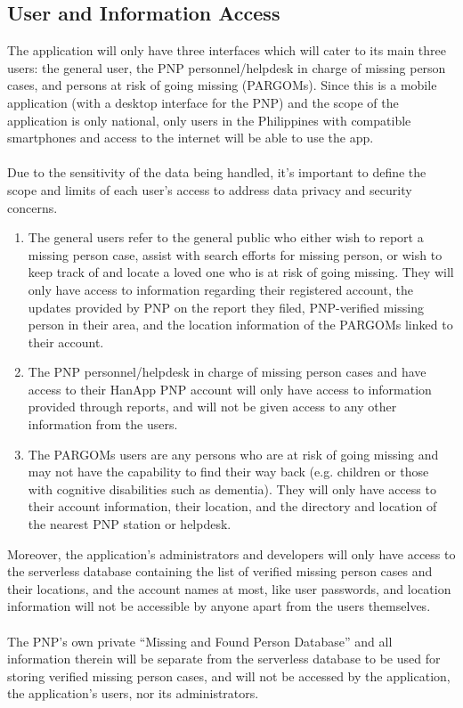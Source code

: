 \subsection{User and Information Access}
The application will only have three interfaces which will cater to its main three users: the general user, the PNP personnel/helpdesk in charge of missing person cases, and persons at risk of going missing (PARGOMs). Since this is a mobile application (with a desktop interface for the PNP) and the scope of the application is only national, only users in the Philippines with compatible smartphones and access to the internet will be able to use the app.
\\\\Due to the sensitivity of the data being handled, it’s important to define the scope and limits of each user’s access to address data privacy and security concerns.
\begin{enumerate}
    \item The general users refer to the general public who either wish to report a missing person case, assist with search efforts for missing person, or wish to keep track of and locate a loved one who is at risk of going missing. They will only have access to information regarding their registered account, the updates provided by PNP on the report they filed, PNP-verified missing person in their area, and the location information of the PARGOMs linked to their account.
    \item The PNP personnel/helpdesk in charge of missing person cases and have access to their HanApp PNP account will only have access to information provided through reports, and will not be given access to any other information from the users.
    \item The PARGOMs users are any persons who are at risk of going missing and may not have the capability to find their way back (e.g. children or those with cognitive disabilities such as dementia). They will only have access to their account information, their location, and the directory and location of the nearest PNP station or helpdesk.
\end{enumerate}
Moreover, the application’s administrators and developers will only have access to the serverless database containing the list of verified missing person cases and their locations, and the account names at most, like user passwords, and location information will not be accessible by anyone apart from the users themselves. 
\\\\The PNP’s own private “Missing and Found Person Database” and all information therein will be separate from the serverless database to be used for storing verified missing person cases, and will not be accessed by the application, the application’s users, nor its administrators.


